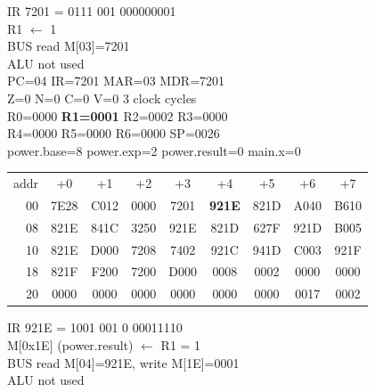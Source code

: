 \noindent\begin{tcolorbox}[stepbox, title={Step 8 \hfill PC 03 \quad LI R1, 1}]
\textcolor{dim}{IR} 7201 = 0111 001 000000001\\
R1 $\leftarrow$ 1\\
\textcolor{dim}{BUS} read M[03]=7201\\
\textcolor{dim}{ALU} \textcolor{dim}{not used}\\
PC=04 IR=7201 MAR=03 MDR=7201\\
Z=0 N=0 C=0 V=0 \hfill \textcolor{dim}{3 clock cycles}\\
R0=0000 \textcolor{wrt}{\textbf{R1=0001}} R2=0002 R3=0000\\
R4=0000 R5=0000 R6=0000 SP=0026\\
\textcolor{dim}{power.base=8  power.exp=2  power.result=0  main.x=0}\\[1pt]
{\setlength{\tabcolsep}{1.6pt}\begin{tabular}{@{}r*{8}{c}@{}}
\textcolor{dim}{addr} & \textcolor{dim}{+0} & \textcolor{dim}{+1} & \textcolor{dim}{+2} & \textcolor{dim}{+3} & \textcolor{dim}{+4} & \textcolor{dim}{+5} & \textcolor{dim}{+6} & \textcolor{dim}{+7}\\
\textcolor{dim}{00} & 7E28 & C012 & 0000 & 7201 & \cellcolor{pcc}\textbf{921E} & 821D & A040 & B610\\
\textcolor{dim}{08} & 821E & 841C & 3250 & 921E & 821D & 627F & 921D & B005\\
\textcolor{dim}{10} & 821E & D000 & 7208 & 7402 & 921C & 941D & C003 & 921F\\
\textcolor{dim}{18} & 821F & F200 & 7200 & D000 & \cellcolor{datac}0008 & \cellcolor{datac}0002 & \cellcolor{datac}0000 & \cellcolor{datac}0000\\
\textcolor{dim}{20} & \cellcolor{stackc}0000 & \cellcolor{stackc}0000 & \cellcolor{stackc}0000 & \cellcolor{stackc}0000 & \cellcolor{stackc}0000 & \cellcolor{stackc}0000 & \cellcolor{stackc}0017 & \cellcolor{stackc}0002\\
\end{tabular}}
\end{tcolorbox}\hfill\begin{tcolorbox}[stepbox, title={Step 9 \hfill PC 04 \quad ST R1, power.result}]
\textcolor{dim}{IR} 921E = 1001 001 0 00011110\\
M[0x1E] (power.result) $\leftarrow$ R1 = 1\\
\textcolor{dim}{BUS} read M[04]=921E, \textcolor{wrt}{write M[1E]=0001}\\
\textcolor{dim}{ALU} \textcolor{dim}{not used}\\

\end{tcolorbox}
